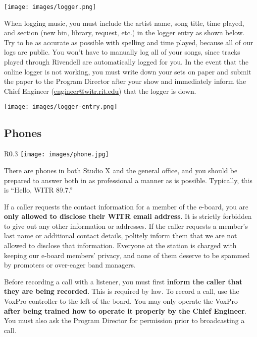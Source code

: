 \documentclass{witrman}
\begin{document}
\texttt{[image: images/logger.png]}

When logging music, you must include the artist name, song title, time played,
and section (new bin, library, request, etc.) in the logger entry as shown
below.  Try to be as accurate as possible with spelling and time played, because
all of our logs are public.  You won't have to manually log all of your songs,
since tracks played through Rivendell are automatically logged for you.  In the
event that the online logger is not working, you must write down your sets on
paper and submit the paper to the Program Director after your show and
immediately inform the Chief Engineer
(\href{mailto:engineer@witr.rit.edu}{engineer@witr.rit.edu}) that the logger is
down.

\texttt{[image: images/logger-entry.png]}

\subsection{Phones}

\begin{wrapfigure}{R}{0.3\linewidth}
    \centering
    \texttt{[image: images/phone.jpg]}
\end{wrapfigure}

There are phones in both Studio X and the general office, and you should be
prepared to answer both in as professional a manner as is possible.  Typically,
this is ``Hello, WITR 89.7.''

If a caller requests the contact information for a member of the e-board, you
are \textbf{only allowed to disclose their WITR email address}.  It is strictly
forbidden to give out any other information or addresses.  If the caller
requests a member's last name or additional contact details, politely inform
them that we are not allowed to disclose that information.  Everyone at the
station is charged with keeping our e-board members' privacy, and none of them
deserve to be spammed by promoters or over-eager band managers.

Before recording a call with a listener, you must first \textbf{inform the
caller that they are being recorded}.  This is required by law.  To record a
call, use the VoxPro controller to the left of the board.  You may only operate
the VoxPro \textbf{after being trained how to operate it properly by the Chief
Engineer}.  You must also ask the Program Director for permission prior to
broadcasting a call.
\end{document}
